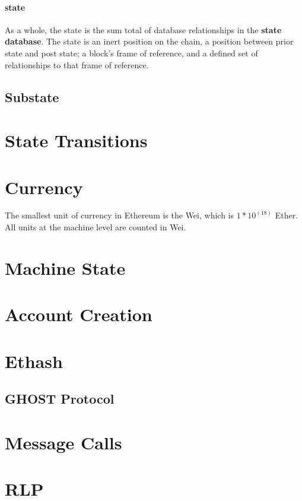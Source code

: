 \documentclass[11pt,a4paper,leqno,bibliography=totoc]{scrartcl}
\newenvironment{alphafootnotes}
{\par\edef\savedfootnotenumber{\number\value{footnote}}
\renewcommand{\thefootnote}{\alph{footnote}}
\setcounter{footnote}{0}}
{\par\setcounter{footnote}{\savedfootnotenumber}}
\begin{document}
\begin{alphafootnotes}
\begin{multicols*}{2}
	\paragraph{state}As a whole, the state is the sum total of database relationships in the \textbf{ \gls{state database}}. The state is an inert position on the chain, a position between prior state and post state; a block's frame of reference, and a defined set of relationships to that frame of reference.

	\subsection{Substate}

\section{State Transitions}

\section{Currency}
	The smallest unit of currency in Ethereum is the Wei, which is $1*10^(18)$ Ether. All units at the machine level are counted in Wei.

\section{Machine State}

\section{Account Creation}

\section{Ethash}

	\subsection{GHOST Protocol}

\section{Message Calls}

\section{RLP}


\end{multicols*}
\end{alphafootnotes}
\end{document}
